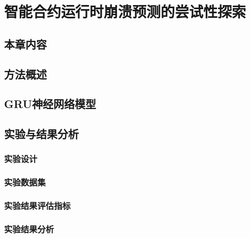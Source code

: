 \chapter{智能合约运行时崩溃预测的尝试性探索}
\section{本章内容}
\section{方法概述}
\section{GRU神经网络模型}
\section{实验与结果分析}
\subsection{实验设计}
\subsection{实验数据集}
\subsection{实验结果评估指标}
\subsection{实验结果分析}
